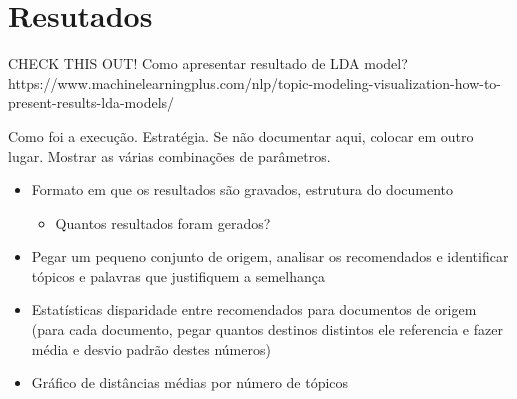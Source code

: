 \section{Resutados}

CHECK THIS OUT!
Como apresentar resultado de LDA model? https://www.machinelearningplus.com/nlp/topic-modeling-visualization-how-to-present-results-lda-models/

Como foi a execução. Estratégia. Se não documentar aqui, colocar em outro lugar.
Mostrar as várias combinações de parâmetros.

\begin{itemize}
    \item Formato em que os resultados são gravados, estrutura do documento
    \begin{itemize}
        \item Quantos resultados foram gerados?
    \end{itemize}
    \item Pegar um pequeno conjunto de origem, analisar os recomendados e identificar tópicos e palavras que justifiquem a semelhança
    \item Estatísticas disparidade entre recomendados para documentos de origem (para cada documento, pegar quantos destinos distintos ele 
    referencia e fazer média e desvio padrão destes números)
    \item Gráfico de distâncias médias por número de tópicos
\end{itemize}